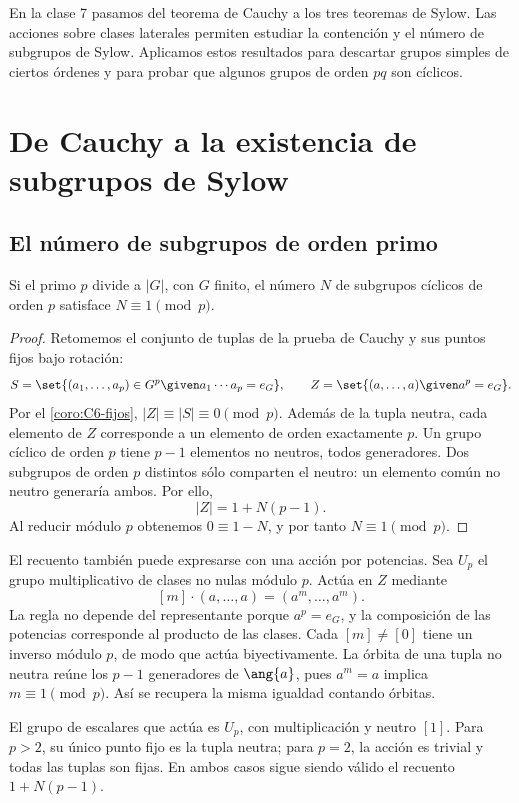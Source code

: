 En la clase 7 pasamos del teorema de Cauchy a los tres teoremas de Sylow. Las acciones sobre clases laterales permiten estudiar la contención y el número de subgrupos de Sylow. Aplicamos estos resultados para descartar grupos simples de ciertos órdenes y para probar que algunos grupos de orden $pq$ son cíclicos.

\section{De Cauchy a la existencia de subgrupos de Sylow}
\subsection{El número de subgrupos de orden primo}
\begin{prop}\label{prop:C7-orden-primo}
Si el primo $p$ divide a $|G|$, con $G$ finito, el número $N$ de subgrupos cíclicos de orden $p$ satisface $N\equiv1\pmod p$.
\end{prop}
\begin{proof}
Retomemos el conjunto de tuplas de la prueba de Cauchy y sus puntos fijos bajo rotación:
\[
S=\set{(a_1,\ldots,a_p)\in G^p\given a_1\cdots a_p=e_G},\qquad
Z=\set{(a,\ldots,a)\given a^p=e_G}.
\]
Por el \cref{coro:C6-fijos}, $|Z|\equiv|S|\equiv0\pmod p$. Además de la tupla neutra, cada elemento de $Z$ corresponde a un elemento de orden exactamente $p$. Un grupo cíclico de orden $p$ tiene $p-1$ elementos no neutros, todos generadores. Dos subgrupos de orden $p$ distintos sólo comparten el neutro: un elemento común no neutro generaría ambos. Por ello,
\[
|Z|=1+N(p-1).
\]
Al reducir módulo $p$ obtenemos $0\equiv1-N$, y por tanto $N\equiv1\pmod p$.
\end{proof}
El recuento también puede expresarse con una acción por potencias. Sea $U_p$ el grupo multiplicativo de clases no nulas módulo $p$. Actúa en $Z$ mediante
\[
[m]\cdot(a,\ldots,a)=(a^m,\ldots,a^m).
\]
La regla no depende del representante porque $a^p=e_G$, y la composición de las potencias corresponde al producto de las clases. Cada $[m]\ne[0]$ tiene un inverso módulo $p$, de modo que actúa biyectivamente. La órbita de una tupla no neutra reúne los $p-1$ generadores de $\ang{a}$, pues $a^m=a$ implica $m\equiv1\pmod p$. Así se recupera la misma igualdad contando órbitas.
\begin{obs}
El grupo de escalares que actúa es $U_p$, con multiplicación y neutro $[1]$. Para $p>2$, su único punto fijo es la tupla neutra; para $p=2$, la acción es trivial y todas las tuplas son fijas. En ambos casos sigue siendo válido el recuento $1+N(p-1)$.
\end{obs}

